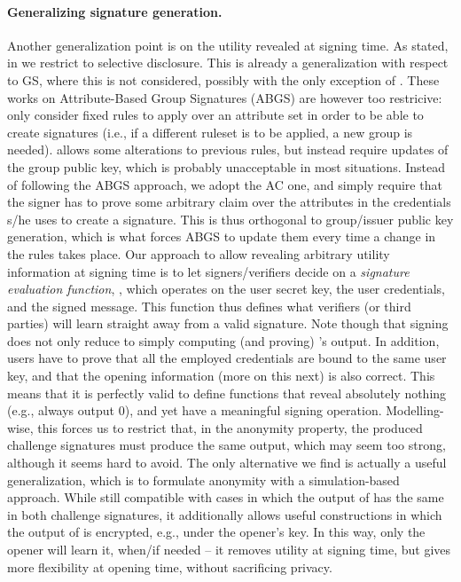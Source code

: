 \paragraph{Generalizing signature generation.} %
Another generalization point is on the utility revealed at signing time. As
stated, in \GSAC we restrict to selective disclosure. This is already a
generalization with respect to GS, where this is not considered, possibly with
the only exception of \cite{khad07a,khad07b,emo09,aa14}. These works on
Attribute-Based Group Signatures (ABGS) are however too restricive:
\cite{khad07a,khad07b,aa14} only consider fixed rules to apply over an
attribute set in order to be able to create signatures (i.e., if a different
ruleset is to be applied, a new group is needed). \cite{emo09} allows some
alterations to previous rules, but instead require updates of the group public
key, which is probably unacceptable in most situations. Instead of following the
ABGS approach, we adopt the AC one, and simply require that the signer has to
prove some arbitrary claim over the attributes in the credentials s/he uses to
create a signature. This is thus orthogonal to group/issuer public key
generation, which is what forces ABGS to update them every time a change in the
rules takes place. Our approach to allow revealing arbitrary utility information
at signing time is to let signers/verifiers decide on a \emph{signature
  evaluation function}, \feval, which operates on the user secret key, the
user credentials, and the signed message. This \feval function thus defines what
verifiers (or third parties) will learn straight away from a valid signature.
Note though that signing does not only reduce to simply computing (and proving)
\feval's output. In addition, users have to prove that all the employed
credentials are bound to the same user key, and that the opening information
(more on this next) is also correct. This means that it is perfectly valid to
define \feval functions that reveal absolutely nothing (e.g., always output
$0$), and yet have a meaningful signing operation. Modelling-wise, this forces
us to restrict that, in the anonymity property, the produced challenge
signatures must produce the same \feval output, which may seem too strong,
although it seems hard to avoid. The only alternative we find is actually a
useful generalization, which is to formulate anonymity with a simulation-based
approach. While still compatible with cases in which the output of \feval has
the same in both challenge signatures, it additionally allows useful
constructions in which the output of \feval is encrypted, e.g., under the
opener's key. In this way, only the opener will learn it, when/if needed -- it
removes utility at signing time, but gives more flexibility at opening time,
without sacrificing privacy.

